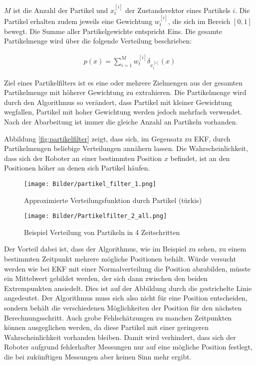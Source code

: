 $M$ ist die Anzahl der Partikel und $x_t^{[i]}$ der Zustandsvektor eines Partikels $i$. Die Partikel erhalten zudem jeweils eine Gewichtung $w_t^{[i]}$, die sich im Bereich $ [0,1] $ bewegt. Die Summe aller Partikelgewichte entspricht Eins. Die gesamte Partikelmenge wird über die folgende Verteilung beschrieben:

\begin{align}
	p(x)=\sum_{i=1}^{M} w_t^{[i]}\delta_{x_t^{[i]}} (x)
\end{align}

Ziel eines Partikelfilters ist es eine oder mehrere Zielmengen aus der gesamten Partikelmenge mit höherer Gewichtung zu extrahieren. Die Partikelmenge wird durch den Algorithmus so verändert, dass Partikel mit kleiner Gewichtung wegfallen, Partikel mit hoher Gewichtung werden jedoch mehrfach verwendet. Nach der Abarbeitung ist immer die gleiche Anzahl an Partikeln vorhanden.

Abbildung \ref{fig:partikelfilter} zeigt, dass sich, im Gegensatz zu EKF, durch Partikelmengen beliebige Verteilungen annähern lassen. Die Wahrscheinlichkeit, dass sich der Roboter an einer bestimmten Position $x$ befindet, ist an den  Positionen höher an denen sich Partikel häufen.   

\begin{figure}
	\centering
	\begin {minipage}[t]{0.4\linewidth}
		\centering
		\texttt{[image: Bilder/partikel\_filter\_1.png]}
		\caption{Approximierte Verteilungsfunktion durch Partikel (türkis)}
		\label{fig:partikelfilter}
	\end{minipage}
	\hfill
 	\begin{minipage}[t]{0.5\linewidth}
		\centering
		\texttt{[image: Bilder/Partikelfilter\_2\_all.png]}
		\caption{Beispiel Verteilung von Partikeln in 4 Zeitschritten}
		\label{fig:partikelfilter2}
	\end{minipage}
\end{figure}

Der Vorteil dabei ist, dass der Algorithmus, wie im Beispiel zu sehen, zu einem bestimmten Zeitpunkt mehrere mögliche Positionen behält. Würde versucht werden wie bei EKF mit einer Normalverteilung die Position abzubilden, müsste ein Mittelwert gebildet werden, der sich dann zwischen den beiden Extrempunkten ansiedelt. Dies ist auf der Abbildung  durch die gestrichelte Linie angedeutet. Der Algorithmus muss sich also nicht für eine Position entscheiden, sondern behält die verschiedenen Möglichkeiten der Position für den nächsten Berechnungsschritt. Auch grobe Fehlschätzungen zu manchen Zeitpunkten können ausgeglichen werden, da diese Partikel mit einer geringeren Wahrscheinlichkeit vorhanden bleiben. Damit wird verhindert, dass sich der Roboter aufgrund fehlerhafter Messungen nur auf eine mögliche Position festlegt, die bei zukünftigen Messungen aber keinen Sinn mehr ergibt.

